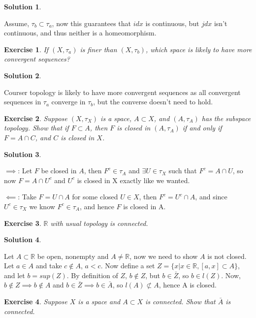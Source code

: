 \documentclass[11pt,a4paper]{article}
\newtheorem{Ex}{Exercise}
\newtheorem{Sol}{Solution}
\begin{document}
\begin{Sol} \end{Sol}
Assume, $\tau_b \subset \tau_a$, now this guarantees that $idx$ is continuous, but $jdx$ isn't continuous, and thus neither is a homeomorphism.

\begin{Ex}
	If $(X, \tau_a)$ is finer than $(X, \tau_b)$, which space is likely to have more convergent sequences?
\end{Ex}

\begin{Sol} \end{Sol}
\noindent Courser topology is likely to have more convergent sequences as all convergent sequences in $\tau_a$ converge in $\tau_b$, but the converse doesn't need to hold. 

\begin{Ex}
	Suppose $(X, \tau_X)$ is a space, $A \subset X$, and $(A, \tau_A)$ has the subspace topology. Show that if $F \subset A$, then $F$ is closed in $(A, \tau_A)$ if and only if $F = A \cap C$, and $C$ is closed in $X$.  
\end{Ex}

\begin{Sol} \end{Sol}
\noindent $\implies$: Let $F$ be closed in $A$, then $F^c \in \tau_A$ and $\exists U \in \tau_X$ such that $F^c = A \cap U$, so now $F = A \cap U^c$ and $U^c$ is closed in X exactly like we wanted.

\noindent $\impliedby$: Take $F = U \cap A$ for some closed $U \in X$, then $F^c = U^c \cap A$, and since $U^c \in \tau_X$ we know $F^c \in \tau_A$, and hence $F$ is closed in A.

\begin{Ex}
  $\mathbb{R}$ with usual topology is connected.
\end{Ex}
 
\begin{Sol} \end{Sol}
Let $A \subset \mathbb{R}$ be open, nonempty and $A \neq \mathbb{R}$, now we need to show $A$ is not closed. Let $a \in A$ and take $c \not \in A$, $a < c$. Now define a set $Z = \{ x| x \in \mathbb{R}, [a,x] \subset A \}$, and let $b = sup(Z)$. By definition of $Z$, $b \not \in Z$, but $b \in \bar{Z}$, so $b \in l(Z) $. Now, $b \not\in Z \implies b \not\in A$ and $b \in \bar{Z} \implies b \in \bar{A}$, so $l(A) \not \subset A$, hence A is closed.  

\begin{Ex}
	Suppose $X$ is a space and $A \subset X$ is connected. Show that $\bar{A}$ is connected.
\end{Ex}
\end{document}
